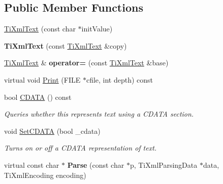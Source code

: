 \subsection*{Public Member Functions}
\begin{DoxyCompactItemize}
\item 
\hyperlink{class_ti_xml_text_af659e77c6b87d684827f35a8f4895960}{Ti\-Xml\-Text} (const char $\ast$init\-Value)
\item 
\hypertarget{class_ti_xml_text_a8d2cc1b4af2208cbb0171cf20f6815d1}{{\bfseries Ti\-Xml\-Text} (const \hyperlink{class_ti_xml_text}{Ti\-Xml\-Text} \&copy)}\label{class_ti_xml_text_a8d2cc1b4af2208cbb0171cf20f6815d1}

\item 
\hypertarget{class_ti_xml_text_aed5b13f9c1b804c616fd533882c29f57}{\hyperlink{class_ti_xml_text}{Ti\-Xml\-Text} \& {\bfseries operator=} (const \hyperlink{class_ti_xml_text}{Ti\-Xml\-Text} \&base)}\label{class_ti_xml_text_aed5b13f9c1b804c616fd533882c29f57}

\item 
virtual void \hyperlink{class_ti_xml_text_a0cafbf6f236c7f02d12b2bffc2b7976b}{Print} (F\-I\-L\-E $\ast$cfile, int depth) const 
\item 
\hypertarget{class_ti_xml_text_ad1a6a6b83fa2271022dd97c072a2b586}{bool \hyperlink{class_ti_xml_text_ad1a6a6b83fa2271022dd97c072a2b586}{C\-D\-A\-T\-A} () const }\label{class_ti_xml_text_ad1a6a6b83fa2271022dd97c072a2b586}

\begin{DoxyCompactList}\small\item\em Queries whether this represents text using a C\-D\-A\-T\-A section. \end{DoxyCompactList}\item 
\hypertarget{class_ti_xml_text_acb17ff7c5d09b2c839393445a3de5ea9}{void \hyperlink{class_ti_xml_text_acb17ff7c5d09b2c839393445a3de5ea9}{Set\-C\-D\-A\-T\-A} (bool \-\_\-cdata)}\label{class_ti_xml_text_acb17ff7c5d09b2c839393445a3de5ea9}

\begin{DoxyCompactList}\small\item\em Turns on or off a C\-D\-A\-T\-A representation of text. \end{DoxyCompactList}\item 
\hypertarget{class_ti_xml_text_abb3e10deb3391772b902247e8d75331f}{virtual const char $\ast$ {\bfseries Parse} (const char $\ast$p, Ti\-Xml\-Parsing\-Data $\ast$data, Ti\-Xml\-Encoding encoding)}\label{class_ti_xml_text_abb3e10deb3391772b902247e8d75331f}


\end{DoxyCompactItemize}
